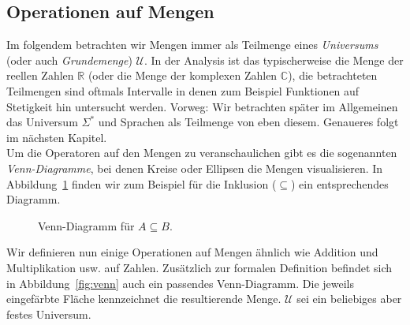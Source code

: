 \documentclass[11pt, a4paper]{article}
\theoremstyle{definition}
\theoremstyle{plain}
\numberwithin{equation}{section}
\begin{document}
\subsection{Operationen auf Mengen}\label{sec:pre_setops}
Im folgendem betrachten wir Mengen immer als Teilmenge eines \textit{Universums} (oder auch \textit{Grundemenge}) $\mathcal{U}$. In der Analysis ist das typischerweise die Menge der reellen Zahlen $\mathbb{R}$ (oder die Menge der komplexen Zahlen $\mathbb{C}$), die betrachteten Teilmengen sind oftmals Intervalle in denen zum Beispiel Funktionen auf Stetigkeit hin untersucht werden. Vorweg: Wir betrachten später im Allgemeinen das Universum $\Sigma^\ast$ und Sprachen als Teilmenge von eben diesem. Genaueres folgt im nächsten Kapitel.\\
Um die Operatoren auf den Mengen zu veranschaulichen gibt es die sogenannten \textit{Venn-Diagramme}, bei denen Kreise oder Ellipsen die Mengen visualisieren. In Abbildung~\ref{fig:venn_subset} finden wir zum Beispiel für die Inklusion ($\subseteq$) ein entsprechendes Diagramm.
\begin{figure}
	\centering
	
	\caption{Venn-Diagramm für $A \subseteq B$.}
	\label{fig:venn_subset}
\end{figure}
Wir definieren nun einige Operationen auf Mengen ähnlich wie Addition und Multiplikation usw. auf Zahlen. Zusätzlich zur formalen Definition befindet sich in Abbildung~\ref{fig:venn} auch ein passendes Venn-Diagramm. Die jeweils eingefärbte Fläche kennzeichnet die resultierende Menge. $\mathcal{U}$ sei ein beliebiges aber festes Universum.
\end{document}
